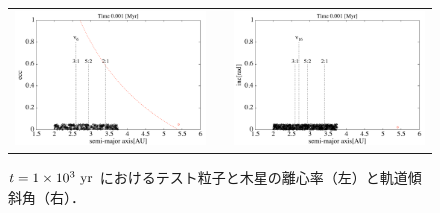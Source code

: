 \documentclass[11pt,a4paper,oneside,onecolumn]{jreport}
\begin{document}
\begin{figure}[H]
\begin{tabular}{ccc}
\begin{minipage}[t]{0.45\hsize}
\centering
\includegraphics[width=8cm]{./image/asteroid_ecc_1kyr.pdf}
\end{minipage} &
\begin{minipage}[t]{0.1\hsize}
\end{minipage} &
\begin{minipage}[t]{0.45\hsize}
\centering
\includegraphics[width=8cm]{./image/asteroid_inc_1kyr.pdf}
\end{minipage}\\
%
\end{tabular}
\caption{$t = 1 \times 10^3\ {\rm yr}$ におけるテスト粒子と木星の離心率（左）と軌道傾斜角（右）．\label{fig:asteroid_ecc_inc_1kyr}}
\end{figure}
\end{document}
